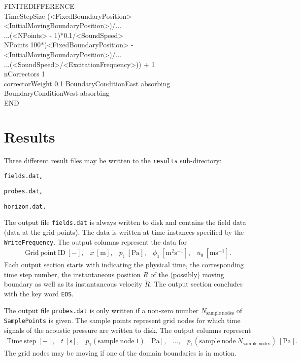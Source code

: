 {FINITEDIFFERENCE \\
TimeStepSize (<FixedBoundaryPosition> - <InitialMovingBoundaryPosition>)/... \\
\hspace*{3cm} ...(<NPoints> - 1)*0.1/<SoundSpeed> \\
NPoints 100*(<FixedBoundaryPosition> - <InitialMovingBoundaryPosition>)/... \\
\hspace*{3cm} ...(<SoundSpeed>/<ExcitationFrequency>)) + 1 \\
nCorrectors 1 \\
correctorWeight 0.1
BoundaryConditionEast absorbing \\
BoundaryConditionWest absorbing \\
END
}






\section{Results}
\label{sec:Results}

Three different result files may be written to the {\tt results} sub-directory:
\begin{compactitem}
\item \tt fields.dat,
\item \tt probes.dat,
\item \tt horizon.dat.
\end{compactitem}
The output file {\tt fields.dat} is always written to disk and contains the field data (data at the grid points). The data is written at time instances specified by the {\tt WriteFrequency}. The output columns represent the data for
\begin{equation}
\begin{array}{lllll}
  \mathrm{Grid\:point\:ID\:\left[-\right]},
& x\:\mathrm{\left[m\right]},
& p_1\:\mathrm{\left[Pa\right]},
& \phi_1\:\mathrm{\left[m^2s^{-1}\right]},
& u_0\:\mathrm{\left[ms^{-1}\right]}.
\end{array}
\nonumber
\end{equation}
Each output section starts with indicating the physical time, the corresponding time step number, the instantaneous position $R$ of the (possibly) moving boundary as well as its instantaneous velocity $\dot R$. The output section concludes with the key word {\tt EOS}.

The output file {\tt probes.dat} is only written if a non-zero number $N_{\mathrm{sample\:nodes}}$ of {\tt SamplePoints} is given. The sample points represent grid nodes for which time signals of the acoustic pressure are written to disk. The output columns represent
\begin{equation}
\begin{array}{lllll}
  \mathrm{Time\:step\:\left[-\right]},
& t\:\mathrm{\left[s\right]},
& p_1\left(\mathrm{sample\:node\:1}\right)\:\mathrm{\left[Pa\right]},
& ...,
& p_1\left(\mathrm{sample\:node\:}N_{\mathrm{sample\:nodes}}\right)\:\mathrm{\left[Pa\right]}.
\end{array}
\nonumber
\end{equation}
The grid nodes may be moving if one of the domain boundaries is in motion.

